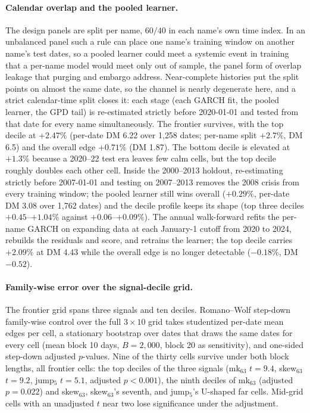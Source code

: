 \documentclass[11pt]{article}
\begin{document}
\paragraph{Calendar overlap and the pooled learner.} The design panels are split per name, $60/40$ in each name's own time index. In an unbalanced panel such a rule can place one name's training window on another name's test dates, so a pooled learner could meet a systemic event in training that a per-name model would meet only out of sample, the panel form of overlap leakage that purging and embargo address. Near-complete histories put the split points on almost the same date, so the channel is nearly degenerate here, and a strict calendar-time split closes it: each stage (each GARCH fit, the pooled learner, the GPD tail) is re-estimated strictly before 2020-01-01 and tested from that date for every name simultaneously. The frontier survives, with the top decile at $+2.47\%$ (per-date DM 6.22 over 1{,}258 dates; per-name split $+2.7\%$, DM 6.5) and the overall edge $+0.71\%$ (DM 1.87). The bottom decile is elevated at $+1.3\%$ because a 2020--22 test era leaves few calm cells, but the top decile roughly doubles each other cell. Inside the 2000--2013 holdout, re-estimating strictly before 2007-01-01 and testing on 2007--2013 removes the 2008 crisis from every training window; the pooled learner still wins overall ($+0.29\%$, per-date DM 3.08 over 1{,}762 dates) and the decile profile keeps its shape (top three deciles $+0.45$--$+1.04\%$ against $+0.06$--$+0.09\%$). The annual walk-forward refits the per-name GARCH on expanding data at each January-1 cutoff from 2020 to 2024, rebuilds the residuals and score, and retrains the learner; the top decile carries $+2.09\%$ at DM 4.43 while the overall edge is no longer detectable ($-0.18\%$, DM $-0.52$).

\paragraph{Family-wise error over the signal-decile grid.} The frontier grid spans three signals and ten deciles. Romano--Wolf step-down family-wise control over the full $3\times10$ grid takes studentized per-date mean edges per cell, a stationary bootstrap over dates that draws the same dates for every cell (mean block 10 days, $B=2{,}000$, block 20 as sensitivity), and one-sided step-down adjusted $p$-values. Nine of the thirty cells survive under both block lengths, all frontier cells: the top deciles of the three signals (mk$_{63}$ $t=9.4$, skew$_{63}$ $t=9.2$, jump$_5$ $t=5.1$, adjusted $p<0.001$), the ninth deciles of mk$_{63}$ (adjusted $p=0.022$) and skew$_{63}$, skew$_{63}$'s seventh, and jump$_5$'s U-shaped far cells. Mid-grid cells with an unadjusted $t$ near two lose significance under the adjustment.
\end{document}
